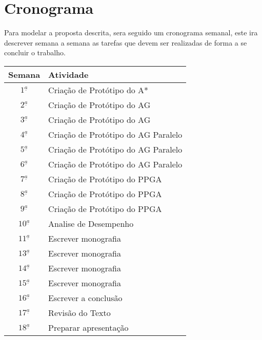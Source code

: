 \chapter[Cronograma]{Cronograma}

Para modelar a proposta descrita, sera seguido um cronograma semanal, este ira descrever semana a semana as tarefas que devem ser realizadas de forma a se concluir o trabalho.


\vspace{.25cm}
\begin{center}
	\begin{tabular}{ |c| p{13.5cm} | }
		\hline
		\textbf{Semana} & \textbf{Atividade} \\ \hline \hline
		$1^{\underline a}$ & Criação de Protótipo do A* \\ \hline
		$2^{\underline a}$ & Criação de Protótipo do AG \\ \hline
		$3^{\underline a}$ & Criação de Protótipo do AG \\ \hline		
		$4^{\underline a}$ & Criação de Protótipo do AG Paralelo \\ \hline		
		$5^{\underline a}$ & Criação de Protótipo do AG Paralelo \\ \hline		
		$6^{\underline a}$ & Criação de Protótipo do AG Paralelo  \\ \hline		
		$7^{\underline a}$ & Criação de Protótipo do PPGA \\ \hline		
		$8^{\underline a}$ & Criação de Protótipo do PPGA \\ \hline		
		$9^{\underline a}$ & Criação de Protótipo do PPGA \\ \hline		
		$10^{\underline a}$ & Analise de Desempenho \\ \hline		
		$11^{\underline a}$ & Escrever monografia \\ \hline		
		$13^{\underline a}$ & Escrever monografia \\ \hline		
		$14^{\underline a}$ & Escrever monografia \\ \hline		
		$15^{\underline a}$ & Escrever monografia \\ \hline		
		$16^{\underline a}$ & Escrever a conclusão \\ \hline		
		$17^{\underline a}$ & Revisão do Texto \\ \hline		
		$18^{\underline a}$ & Preparar apresentação  \\ \hline
		\end{tabular}
\end{center}